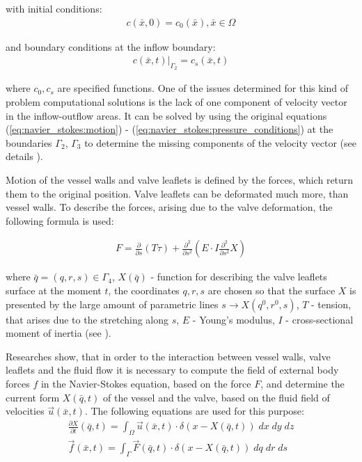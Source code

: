 \documentclass[conference]{IEEEtran}
\begin{document}
with initial conditions:
\begin{gather}
    \label{eq:convection:conditions}
    c(\bar{x}, 0) = c_0(\bar{x}), \bar{x} \in \Omega
\end{gather}

and boundary conditions at the inflow boundary:
\begin{gather}
    \label{eq:convection:conditions}
    c(\bar{x}, t)|_{\Gamma_2} = c_s(\bar{x}, t)
\end{gather}

where $c_0, c_s$ are specified functions. 
One of the issues determined for this kind of problem computational solutions is the lack of one component of velocity vector in the inflow-outflow areas.
It can be solved by using the original equations (\ref{eq:navier_stokes:motion}) - (\ref{eq:navier_stokes:pressure_conditions}) at the boundaries
$\Gamma_2$, $\Gamma_3$ to determine the missing components of the velocity vector (see details \cite{gummel, geidarov, milosevic}).

Motion of the vessel walls and valve leaflets is defined by the forces, which return them to the original position. Valve leaflets can be deformated much more,
than vessel walls. To describe the forces, arising due to the valve deformation, the following formula is used:

\begin{gather}
    \label{eq:boundary_force}
    F = \frac{\partial}{\partial s} (T \tau) + \frac{\partial^2}{\partial s^2} (E \cdot I \frac{\partial^2}{\partial s^2} X)
\end{gather}

where $\bar{q} = (q, r, s) \in \Gamma_4$, $X(\bar{q})$ - function for describing the valve leaflets surface at the moment $t$, the coordinates $q, r, s$ are chosen 
so that the surface $X$ is presented by the large amount of parametric lines $s \rightarrow X(q^0, r^0, s)$, $T$ - tension,
that arises due to the stretching along $s$, $E$ - Young's modulus, $I$ - cross-sectional moment of inertia (see \cite{griffith_2011}).

Researches \cite{pescin_2002, griffith_2011} show, that in order to the interaction between vessel walls, valve leaflets and the fluid flow it is necessary
to compute the field of external body forces $f$ in the Navier-Stokes equation, based on the force $F$, and determine the current form $X(\bar{q}, t)$ 
of the vessel and the valve, based on the fluid field of velocities $\vec{u}(\bar{x}, t)$. The following equations are used for this purpose:
\begin{gather}
    \label{eq:interaction:velocity}
    \frac{\partial X}{\partial t}(\bar{q}, t) = \int_{\Omega} \vec{u}(\bar{x}, t) \cdot \delta (x - X(\bar{q}, t))\; dx\; dy\; dz\\
    \label{eq:interaction:force}
    \vec{f}(\bar{x}, t) = \int_{\Gamma} \vec{F}(\bar{q}, t) \cdot \delta (x - X(\bar{q}, t))\; dq\; dr\; ds
\end{gather}
\end{document}
